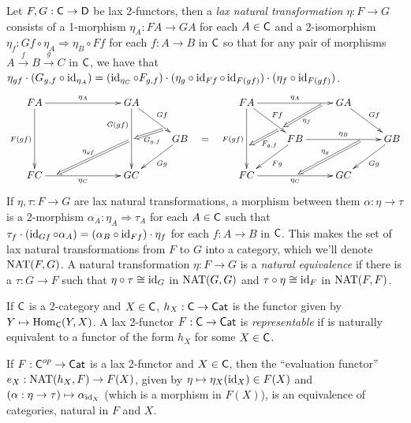  \begin{definition}
   Let $F,G:\text{\sf C}\to \text{\sf D}$ be lax 2-functors, then a \emph{lax natural transformation}
   $\eta:F\to G$ consists of a 1-morphism $\eta_A:FA\to GA$ for each $A\in \text{\sf C}$ and a
   2-isomorphism $\eta_{f}:Gf\circ \eta_A \Rightarrow \eta_B\circ Ff$ for each $f:A\to B$
   in $\text{\sf C}$ so that for any pair of morphisms $A\xrightarrow f B\xrightarrow g C$ in $\text{\sf C}$,
   we have that $\eta_{gf}\cdot(G_{g,f}\circ \operatorname{id}_{\eta_A})=( \operatorname{id}_{\eta_C}\circ
   F_{g,f})\cdot (\eta_g\circ \operatorname{id}_{Ff}\circ\operatorname{id}_{F(gf)})\cdot (\eta_f\circ \operatorname{id}_{F(gf)})$.
   \[\xymatrix@!0 @R+1pc @C+2pc{
    FA\ar[rr]^{\eta_A}\ar[dd]_{F(gf)}_{}="b" & &
        GA\ar[dd]_(.3){G(gf)}_{}="c"^{}="b" \ar[dr]^{Gf}_(.7){}="a"\\
    & & & GB\ar[dl]^{Gg}\\
    FC\ar[rr]_{\eta_C}^(.2){}="d" & & GC
    \ar@{=>}^{G_{g,f}} "a";"b"
    \ar@{=>}_{\eta_{gf}} "c";"d"
   }\quad\raisebox{-3pc}{$=$}\quad
   \xymatrix@!0 @R+1pc @C+2pc{
    FA \ar[dr]^{Ff}_(.7){}="a"^(.7){}="d"
        \ar[rr]^{\eta_A}_(.8){}="c"
        \ar[dd]_{F(gf)}^(.6){}="b"
        & & GA\ar[dr]^{Gf}\\
    & FB\ar[dl]^{Fg} \ar[rr]^{\eta_B}_(.7){}="e" & & GB\ar[dl]^{Gg}\\
    FC \ar[rr]_{\eta_C}^{}="f" & & GC
    \ar@{=>}^{F_{g,f}} "a";"b"
    \ar@{=>}^{\eta_f} "c";"d"
    \ar@{=>}_{\eta_g} "e";"f"
   }\]
    If $\eta,\tau:F\to G$ are lax natural transformations, a morphism between them
   $\alpha:\eta\to \tau$ is a 2-morphism $\alpha_A:\eta_A\Rightarrow \tau_A$ for each
   $A\in \text{\sf C}$ such that $\tau_f\cdot(\operatorname{id}_{Gf}\circ \alpha_A) = (\alpha_B \circ
   \operatorname{id}_{Ff})\cdot \eta_f$ for each $f:A\to B$ in $\text{\sf C}$. This makes the set of lax natural
   transformations from $F$ to $G$ into a category, which we'll denote $\operatorname{NAT}(F,G)$. A
   natural transformation $\eta:F\to G$ is a \emph{natural equivalence} if there is a
   $\tau:G\to F$ such that $\eta\circ \tau\cong \operatorname{id}_G$ in $\operatorname{NAT}(G,G)$ and $\tau\circ
   \eta\cong \operatorname{id}_F$ in $\operatorname{NAT}(F,F)$.
 \end{definition}
 \begin{definition}
   If $\text{\sf C}$ is a 2-category and $X\in\text{\sf C}$, $h_X:\text{\sf C}\to \text{\sf Cat}$ is the functor given by
   $Y\mapsto \operatorname{Hom}_{\text{\sf C}}(Y,X)$. A lax 2-functor $F:\text{\sf C}\to \text{\sf Cat}$ is \emph{representable} if is
   naturally equivalent to a functor of the form $h_X$ for some $X\in \text{\sf C}$.
 \end{definition}
 \begin{theorem}
   If $F:\text{\sf C}^{op}\to \text{\sf Cat}$ is a lax 2-functor and $X\in \text{\sf C}$, then the ``evaluation
   functor'' $e_X:\operatorname{NAT}(h_X,F)\to F(X)$, given by $\eta\mapsto \eta_X(\operatorname{id}_X)\in F(X)$ and
   $(\alpha:\eta\to \tau)\mapsto \alpha_{\operatorname{id}_X}$ (which is a morphism in $F(X)$), is an
   equivalence of categories, natural in $F$ and $X$.
 \end{theorem}
